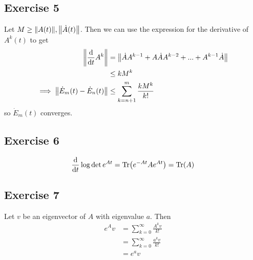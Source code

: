 \subsection{Exercise 5}
Let $M \geq \norm{A(t)}, \norm{\dot{A}(t)}$. Then we can use the expression for the derivative of $A^k(t)$
to get
\begin{align*}
        \norm{\dv{t} A^k} &= \norm{\dot{A} A^{k - 1} + A \dot{A} A^{k - 2} + ... + A^{k - 1}\dot{A}} \\
                   &\leq kM^k \\
        \implies \norm{\dot{E}_m(t) - \dot{E}_n(t)} &\leq \sum_{k = n + 1}^m \frac{kM^k}{k!}
\end{align*}
so $\dot{E}_m(t)$ converges.

\subsection{Exercise 6}
\begin{align*}
        \dv{t} \log\det e^{At} = \Tr(e^{-At} A e^{At}) = \Tr(A)
\end{align*}

\subsection{Exercise 7}
Let $v$ be an eigenvector of $A$ with eigenvalue $a$. Then
\begin{align*}
        e^A v &= \sum_{k = 0}^\infty \frac{A^k v}{k!} \\
              &= \sum_{k = 0}^\infty \frac{a^k v}{k!} \\
              &= e^a v
\end{align*}

